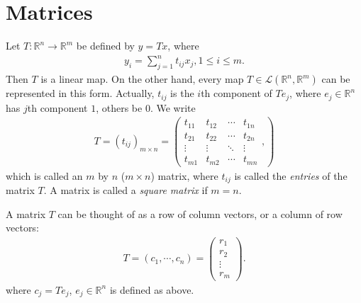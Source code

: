 \documentclass[10pt]{book}
\theoremstyle{definition}
\numberwithin{equation}{chapter}
\begin{document}
\chapter{Matrices}
Let $T:\mathbb{R}^n\to\mathbb{R}^m$ be defined by $y = T x$, where
\begin{align*}
    y_i = \sum^n_{j=1} t_{ij}x_j, 1\leq i\leq m.
\end{align*}
Then $T$ is a linear map. On the other hand, every map $T\in \mathscr{L}(\mathbb{R}^n,\mathbb{R}^m)$ can be represented in this form. Actually, $t_{ij}$ is the $i$th component of $Te_j$, where $e_j\in \mathbb{R}^n$ has $j$th component $1$, others be $0$. We write
\begin{align*}
    T = (t_{ij})_{m\times n} = \left(
        \begin{matrix}
        t_{11} & t_{12} & \cdots & t_{1n}\\
        t_{21} & t_{22} & \cdots & t_{2n}\\
        \vdots & \vdots & \ddots & \vdots\\
        t_{m1} & t_{m2} & \cdots & t_{mn}
        \end{matrix},
    \right)
\end{align*}
which is called an $m$ by $n$ ($m\times n$) matrix, where $t_{ij}$ is called the \emph{entries} of the matrix $T$. A matrix is called a \emph{square matrix} if $m=n$. 

A matrix $T$ can be thought of as a row of column vectors, or a column of row vectors: 
\begin{align*}
    T = (c_1,\cdots,c_n) = \left(
    \begin{matrix}
        r_1 \\
        r_2 \\
        \vdots \\
        r_m 
        \end{matrix}
    \right).
\end{align*}
where $c_j = T e_j$, $e_j\in\mathbb{R}^n$ is defined as above.

\medskip
\end{document}

